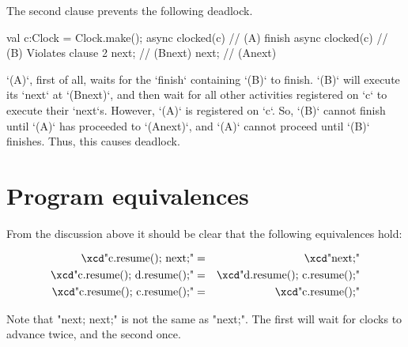 The second clause prevents the following deadlock.  
\begin{xten}
val c:Clock = Clock.make();
async clocked(c) {                // (A) 
      finish async clocked(c) {   // (B) Violates clause 2
            next;                 // (Bnext)
      }
      next;                       // (Anext)
}
\end{xten}
\xcd`(A)`, first of all, waits for the \xcd`finish` containing \xcd`(B)` to
finish.  
\xcd`(B)` will execute its \xcd`next` at \xcd`(Bnext)`, and then wait for all
other activities registered on \xcd`c` to execute their \xcd`next`s.
However, \xcd`(A)` is registered on \xcd`c`.  So, \xcd`(B)` cannot finish
until \xcd`(A)` has proceeded to \xcd`(Anext)`, and \xcd`(A)` cannot proceed
until \xcd`(B)` finishes. Thus, this causes deadlock.


\section{Program equivalences}
From the discussion above it should be clear that the following
equivalences hold:

\begin{eqnarray}
 \mbox{\xcd"c.resume(); next;"}       &=& \mbox{\xcd"next;"}\\
 \mbox{\xcd"c.resume(); d.resume();"} &=& \mbox{\xcd"d.resume(); c.resume();"}\\
 \mbox{\xcd"c.resume(); c.resume();"} &=& \mbox{\xcd"c.resume();"}
\end{eqnarray}

Note that \xcd"next; next;" is not the same as \xcd"next;". The
first will wait for clocks to advance twice, and the second
once.  


